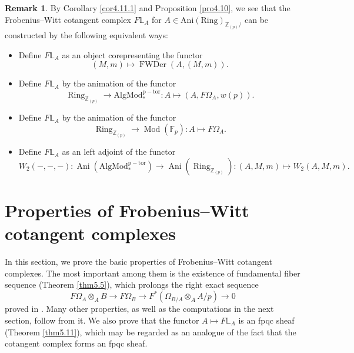 \documentclass[11pt, a4paper]{amsart}
\theoremstyle{plain}
\theoremstyle{definition}
\newtheorem{remark}[theorem]{Remark}
\begin{document}
\begin{remark}
    By Corollary \ref{cor4.11.1} and Proposition \ref{pro4.10}, we see that the Frobenius--Witt cotangent complex $F\mathbb L_A$ for $A\in \operatorname{Ani(Ring)}_{\mathbb Z_{(p)}/}$ can be constructed by the following equivalent ways:\begin{itemize}
        \item Define $F\mathbb L_A$ as an object corepresenting the functor \[(M,m)\mapsto \operatorname{FWDer}(A,(M,m)).\]
        \item Define $F\mathbb L_A$ by the animation of the functor \[\operatorname{Ring}_{\mathbb Z_{(p)}}\to \operatorname{AlgMod_*^{p-tor}}:A\mapsto (A,F\Omega_A,w(p)).\]
        \item Define $F\mathbb L_A$ by the animation of the functor \[\operatorname{Ring}_{\mathbb Z_{(p)}}\to \operatorname{Mod}(\mathbb F_p):A\mapsto F\Omega_A.\]
        \item Define $F\mathbb L_A$ as an left adjoint of the functor \[W_2(-,-,-):\operatorname{Ani}(\operatorname{AlgMod^{p-tor}_*})\to \operatorname{Ani}(\operatorname{Ring}_{\mathbb Z_{(p)}}):(A,M,m)\mapsto W_2(A,M,m).\]
    \end{itemize}
\end{remark}



\section{Properties of Frobenius--Witt cotangent complexes}
In this section, we prove the basic properties of Frobenius--Witt cotangent complexes. The most important among them is the existence of fundamental fiber sequence (Theorem \ref{thm5.5}), which prolongs the right exact sequence \[F\Omega_A\otimes_AB\to F\Omega_B\to F^*(\Omega_{B/A}\otimes_AA/p)\to 0\] proved in \cite[Lemma 2.9]{Sai22}. Many other properties, as well as the computations in the next section, follow from it. We also prove that the functor $A\mapsto F\mathbb L_A$ is an fpqc sheaf (Theorem \ref{thm5.11}), which may be regarded as an analogue of the fact that the cotangent complex forms an fpqc sheaf.
\end{document}
